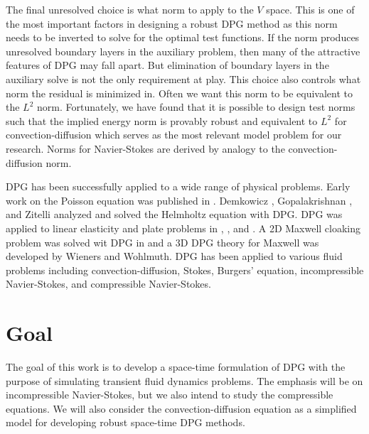 \documentclass[Proposal.tex]{subfiles}
\begin{document}
The final unresolved choice is what norm to apply to the $V$ space.
This is one of the most important factors in designing a robust DPG method as this norm needs to be inverted to solve for the optimal test functions.
If the norm produces unresolved boundary layers in the auxiliary problem, then many of the attractive features of DPG may fall apart.
But elimination of boundary layers in the auxiliary solve is not the only requirement at play. 
This choice also controls what norm the residual is minimized in. 
Often we want this norm to be equivalent to the $L^2$ norm.
Fortunately, we have found that it is possible to design test norms such that the implied energy norm 
is provably robust and equivalent to $L^2$ for convection-diffusion which
serves as the most relevant model problem for our research.
Norms for Navier-Stokes are derived by analogy to the convection-diffusion norm.

DPG has been successfully applied to a wide range of physical problems.
Early work on the Poisson equation was published in \cite{DPGPoisson}.
Demkowicz \etal\cite{DPGHelmholtz}, Gopalakrishnan \etal\cite{Gopalakrishnan2014}, and Zitelli \etal\cite{DPG4} 
analyzed and solved the Helmholtz equation with DPG.
DPG was applied to linear elasticity and plate problems in \cite{BramwellDPG}, \cite{NiemiBramwellDemkowicz10}, and \cite{BramwellDemkowiczQiu10}.
A 2D Maxwell cloaking problem was solved wit DPG in \cite{DPGCloaking} 
and a 3D DPG theory for Maxwell was developed by Wieners and Wohlmuth\cite{WohlmuthReport}.
DPG has been applied to various fluid problems including convection-diffusion\cite{DPG3,DemkowiczHeuer,ChanHeuerThanhDemkowicz2012,Chan2013,Ellis2013Report},
Stokes\cite{DPGStokes,Ellis2013Report}, Burgers' equation\cite{Chan2013dpg}, incompressible Navier-Stokes\cite{NateDissertation}, 
and compressible Navier-Stokes\cite{JesseDissertation}.

\section{Goal}
The goal of this work is to develop a space-time formulation of DPG with the purpose of simulating transient 
fluid dynamics problems.
The emphasis will be on incompressible Navier-Stokes, but we also intend to study the compressible equations.
We will also consider the convection-diffusion equation as a simplified model for developing robust space-time DPG methods.
\end{document}
